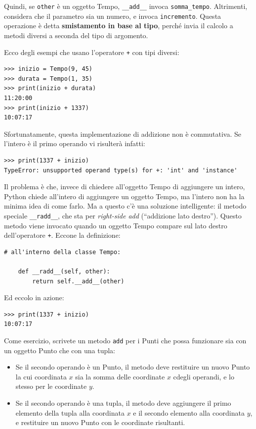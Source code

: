 \documentclass[10pt]{book}
\begin{document}
Quindi, se {\tt other} è un oggetto Tempo, \verb"__add__" invoca
\verb"somma_tempo".  Altrimenti, considera che il parametro sia un numero, e invoca {\tt incremento}.  Questa operazione è detta {\bf smistamento in base al tipo}, perché invia il calcolo a metodi diversi a seconda del tipo di argomento.

Ecco degli esempi che usano l'operatore {\tt +} con tipi diversi:

\begin{verbatim}
>>> inizio = Tempo(9, 45)
>>> durata = Tempo(1, 35)
>>> print(inizio + durata)
11:20:00
>>> print(inizio + 1337)
10:07:17
\end{verbatim}
%
Sfortunatamente, questa implementazione di addizione non è commutativa. Se l'intero è il primo operando vi risulterà infatti:

\begin{verbatim}
>>> print(1337 + inizio)
TypeError: unsupported operand type(s) for +: 'int' and 'instance'
\end{verbatim}
%
Il problema è che, invece di chiedere all'oggetto Tempo di aggiungere un intero, Python chiede all'intero di aggiungere un oggetto Tempo, ma l'intero non ha la minima idea di come farlo. Ma a questo c'è una soluzione intelligente: il metodo speciale \verb"__radd__", che sta per {\em right-side add} (``addizione lato destro'').
Questo metodo viene invocato quando un oggetto Tempo compare sul lato destro dell'operatore {\tt +}.  Eccone la definizione:

\begin{verbatim}
# all'interno della classe Tempo:

    def __radd__(self, other):
        return self.__add__(other)
\end{verbatim}
%
Ed eccolo in azione:

\begin{verbatim}
>>> print(1337 + inizio)
10:07:17
\end{verbatim}
%

Come esercizio, scrivete un metodo {\tt add} per i Punti che possa funzionare sia con un oggetto Punto che con una tupla:  

\begin{itemize}

\item Se il secondo operando è un Punto, il metodo deve restituire un nuovo Punto la cui coordinata $x$ sia la somma delle coordinate $x$ cdegli operandi, e lo stesso per le coordinate $y$.

\item Se il secondo operando è una tupla, il metodo deve aggiungere il primo elemento della tupla alla coordinata $x$ e il secondo elemento alla coordinata $y$, e restituire un nuovo Punto con le coordinate risultanti.

\end{itemize}
\end{document}
